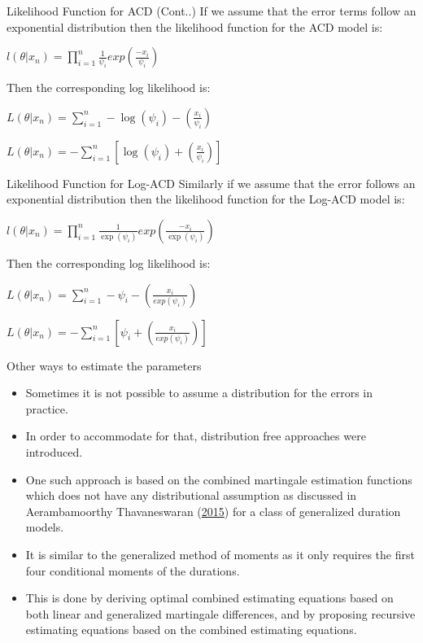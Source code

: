 \documentclass[
  ignorenonframetext,
]{beamer}
\begin{document}
\begin{frame}{Likelihood Function for ACD (Cont..)}
\protect\hypertarget{likelihood-function-for-acd-cont..}{}
If we assume that the error terms follow an exponential distribution
then the likelihood function for the ACD model is:

\(l(\theta|x_n)=\prod_{i=1}^n\frac{1}{\psi_i}exp(\frac{-x_i}{\psi_i})\)

Then the corresponding log likelihood is:

\(L(\theta|x_n)=\sum_{i=1}^n-\log(\psi_i)-(\frac{x_i}{\psi_i})\)

\(L(\theta|x_n)=-\sum_{i=1}^n[\log(\psi_i)+(\frac{x_i}{\psi_i})]\)
\end{frame}

\begin{frame}{Likelihood Function for Log-ACD}
\protect\hypertarget{likelihood-function-for-log-acd}{}
Similarly if we assume that the error follows an exponential
distribution then the likelihood function for the Log-ACD model is:

\(l(\theta|x_n)=\prod_{i=1}^n\frac{1}{\exp(\psi_i)}exp(\frac{-x_i}{\exp(\psi_i)})\)

Then the corresponding log likelihood is:

\(L(\theta|x_n)=\sum_{i=1}^n-\psi_i-(\frac{x_i}{exp(\psi_i)})\)

\(L(\theta|x_n)=-\sum_{i=1}^n[\psi_i+(\frac{x_i}{exp(\psi_i)})]\)
\end{frame}

\begin{frame}{Other ways to estimate the parameters}
\protect\hypertarget{other-ways-to-estimate-the-parameters}{}
\begin{itemize}
\item
  Sometimes it is not possible to assume a distribution for the errors
  in practice.
\item
  In order to accommodate for that, distribution free approaches were
  introduced.
\item
  One such approach is based on the combined martingale estimation
  functions which does not have any distributional assumption as
  discussed in Aerambamoorthy Thavaneswaran
  (\protect\hyperlink{ref-EE}{2015}) for a class of generalized duration
  models.
\item
  It is similar to the generalized method of moments as it only requires
  the first four conditional moments of the durations.
\item
  This is done by deriving optimal combined estimating equations based
  on both linear and generalized martingale differences, and by
  proposing recursive estimating equations based on the combined
  estimating equations.
\end{itemize}
\end{frame}
\end{document}

